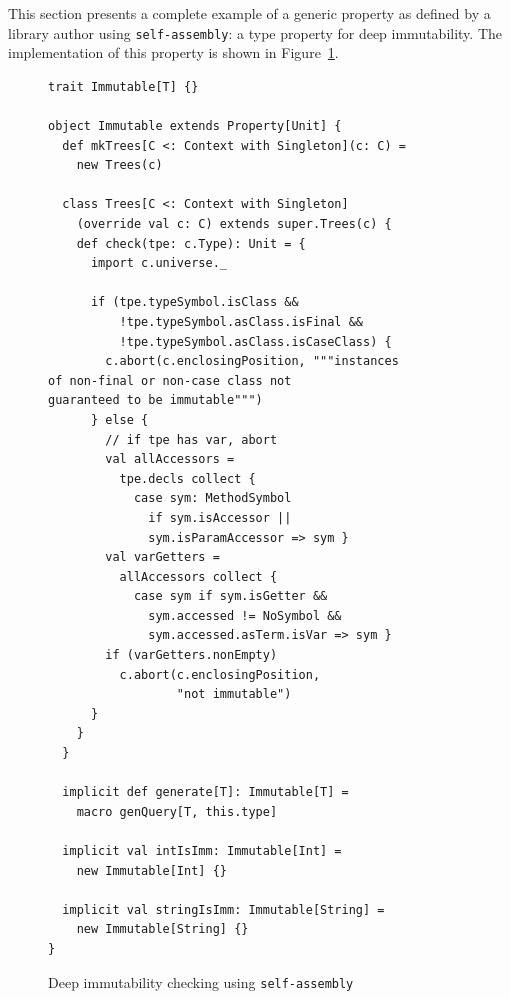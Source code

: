 \documentclass[preprint,nocopyrightspace]{sigplanconf}
\newcommand{\selfassembly}{\texttt{self-assembly~}}
\begin{document}

This section presents a complete example of a generic property as defined by a
library author using \texttt{self-assembly}: a type property for deep immutability. The
implementation of this property is shown in Figure~\ref{fig:immutable}.


\begin{figure}
\centering
\begin{lstlisting}
trait Immutable[T] {}

object Immutable extends Property[Unit] {
  def mkTrees[C <: Context with Singleton](c: C) =
    new Trees(c)

  class Trees[C <: Context with Singleton]
    (override val c: C) extends super.Trees(c) {
    def check(tpe: c.Type): Unit = {
      import c.universe._

      if (tpe.typeSymbol.isClass &&
          !tpe.typeSymbol.asClass.isFinal &&
          !tpe.typeSymbol.asClass.isCaseClass) {
        c.abort(c.enclosingPosition, """instances
of non-final or non-case class not
guaranteed to be immutable""")
      } else {
        // if tpe has var, abort
        val allAccessors =
          tpe.decls collect {
            case sym: MethodSymbol
              if sym.isAccessor ||
              sym.isParamAccessor => sym }
        val varGetters =
          allAccessors collect {
            case sym if sym.isGetter &&
              sym.accessed != NoSymbol &&
              sym.accessed.asTerm.isVar => sym }
        if (varGetters.nonEmpty)
          c.abort(c.enclosingPosition,
                  "not immutable")
      }
    }
  }

  implicit def generate[T]: Immutable[T] =
    macro genQuery[T, this.type]

  implicit val intIsImm: Immutable[Int] =
    new Immutable[Int] {}

  implicit val stringIsImm: Immutable[String] =
    new Immutable[String] {}
}
\end{lstlisting}
  \caption{Deep immutability checking using \selfassembly}
  \label{fig:immutable}
\end{figure}
\end{document}
